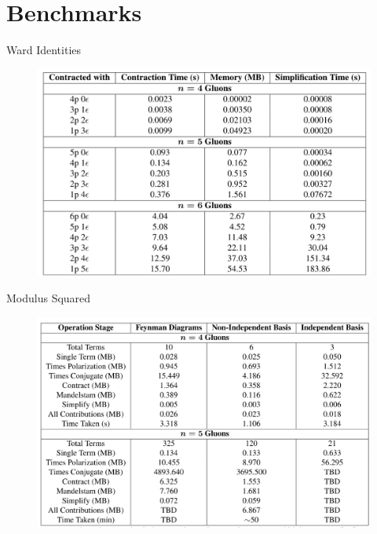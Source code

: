 \documentclass{beamer}
\begin{document}
\section{Benchmarks}


\begin{frame}{Ward Identities}
  \centering 
    \begin{figure}
          \includegraphics[width=\textwidth, keepaspectratio]{figures/ward.png}
    \end{figure}
\end{frame}

\begin{frame}{Modulus Squared}
  \centering 
    \begin{figure}
          \includegraphics[width=\textwidth, keepaspectratio]{figures/Modulus.png}
    \end{figure}
\end{frame}
\end{document}
